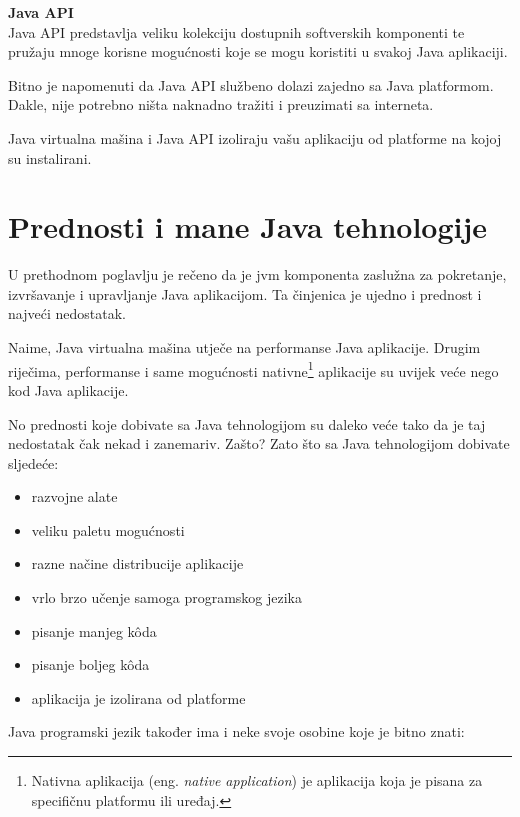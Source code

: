\textbf{Java API}\\
Java API predstavlja veliku kolekciju dostupnih softverskih komponenti te pružaju mnoge korisne mogućnosti koje se mogu koristiti u svakoj Java aplikaciji.

Bitno je napomenuti da Java API službeno dolazi zajedno sa Java platformom. Dakle, nije potrebno ništa naknadno tražiti i preuzimati sa interneta.

\begin{tipbox}
    Java virtualna mašina i Java API izoliraju vašu aplikaciju od platforme na kojoj su instalirani.
\end{tipbox}

\section{Prednosti i mane Java tehnologije}
U prethodnom poglavlju je rečeno da je \gls{jvm} komponenta zaslužna za pokretanje, izvršavanje i upravljanje Java aplikacijom. Ta činjenica je ujedno i prednost i najveći nedostatak.

Naime, Java virtualna mašina utječe na performanse Java aplikacije. Drugim riječima, performanse i same mogućnosti nativne\footnote{Nativna aplikacija (eng. \emph{native application}) je aplikacija koja je pisana za specifičnu platformu ili uređaj.} aplikacije su uvijek veće nego kod Java aplikacije.

No prednosti koje dobivate sa Java tehnologijom su daleko veće tako da je taj nedostatak čak nekad i zanemariv. Zašto? Zato što sa Java tehnologijom dobivate sljedeće:

\begin{itemize}
    \item razvojne alate
    \item veliku paletu mogućnosti
    \item razne načine distribucije aplikacije
    \item vrlo brzo učenje samoga programskog jezika
    \item pisanje manjeg kôda
    \item pisanje boljeg kôda
    \item aplikacija je izolirana od platforme
\end{itemize}

Java programski jezik također ima i neke svoje osobine koje je bitno znati:

